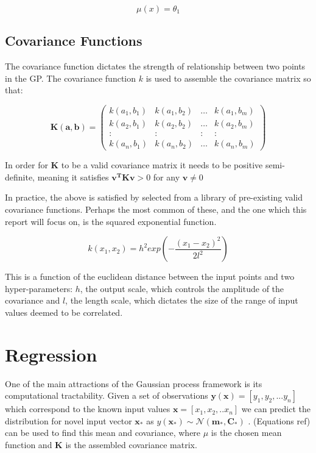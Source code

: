 \documentclass[a4paper,11pt]{report}
\begin{document}
\begin{equation} \label{eq:GPmean}
\mu (x) = \theta_1
\end{equation}

\subsection{Covariance Functions}

The covariance function dictates the strength of relationship between two points in the GP. The covariance function \(k\) is used to assemble the covariance matrix so that: 

\begin{equation}
\mathbf{K(a,b)} =  \left( \begin{array}{cccc}
k(a_1,b_1) & k(a_1,b_2) &  \dots & k(a_1,b_m) \\
k(a_2,b_1) & k(a_2,b_2) &  \dots & k(a_2,b_m) \\
: & : & : & : \\
k(a_n,b_1) & k(a_n,b_2) &  \dots & k(a_n,b_m)  \end{array} \right) 
\end{equation}

In order for \textbf{K} to be a valid covariance matrix it needs to be positive semi-definite, meaning it satisfies \( \mathbf{v^{T} K v} > 0\) for any \( \mathbf{v} \neq 0 \)

In practice, the above is satisfied by selected from a library of pre-existing valid covariance functions. Perhaps the most common of these, and the one which this report will focus on, is the squared exponential function.

\begin{equation}
k(x_1,x_2) = h^2 exp(- \frac{(x_1-x_2)^2}{2 l^2})
\end{equation} 

This is a function of the euclidean distance between the input points and two hyper-parameters: \(h\), the output scale, which controls the amplitude of the covariance and \(l\), the length scale, which dictates the size of the range of input values deemed to be correlated. 


\section{Regression}

One of the main attractions of the Gaussian process framework is its computational tractability. Given a set of observations \( \mathbf{y}( \mathbf{x} ) = [y_1, y_2, ... y_n] \) which correspond to the known input values \( \mathbf{x} = [x_1, x_2, .. x_n] \) we can predict the distribution for novel input vector \( \mathbf{x_*} \) as \( y( \mathbf{x_*}) \sim \mathcal{N}(\mathbf{m_*,C_*}) \) \cite{GP-robots}. (Equations ref) can be used to find this mean and covariance, where \(\mu\) is the chosen mean function and \(\mathbf{K}\) is the assembled covariance matrix.
\end{document}
